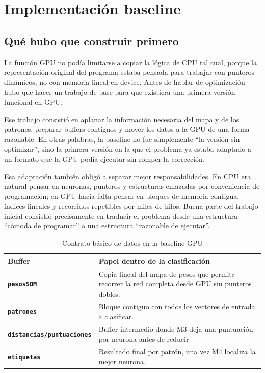 \documentclass[11pt,a4paper]{article}
\begin{document}
\section{Implementación baseline}

\subsection{Qué hubo que construir primero}

La función GPU no podía limitarse a copiar la lógica de CPU tal cual, porque la representación original del programa estaba pensada para trabajar con punteros dinámicos, no con memoria lineal en device. Antes de hablar de optimización hubo que hacer un trabajo de base para que existiera una primera versión funcional en GPU.

Ese trabajo consistió en aplanar la información necesaria del mapa y de los patrones, preparar buffers contiguos y mover los datos a la GPU de una forma razonable. En otras palabras, la baseline no fue simplemente ``la versión sin optimizar'', sino la primera versión en la que el problema ya estaba adaptado a un formato que la GPU podía ejecutar sin romper la corrección.

Esa adaptación también obligó a separar mejor responsabilidades. En CPU era natural pensar en neuronas, punteros y estructuras enlazadas por conveniencia de programación; en GPU hacía falta pensar en bloques de memoria contigua, índices lineales y recorridos repetibles por miles de hilos. Buena parte del trabajo inicial consistió precisamente en traducir el problema desde una estructura ``cómoda de programar'' a una estructura ``razonable de ejecutar''.

\begin{table}[H]
\centering
\caption{Contrato básico de datos en la baseline GPU}
\label{tab:baseline-datos}
\begin{tabularx}{\textwidth}{>{\bfseries}l L}
\toprule
Buffer & Papel dentro de la clasificación \\
\midrule
\texttt{pesosSOM} & Copia lineal del mapa de pesos que permite recorrer la red completa desde GPU sin punteros dobles. \\
\texttt{patrones} & Bloque contiguo con todos los vectores de entrada a clasificar. \\
\texttt{distancias/puntuaciones} & Buffer intermedio donde M3 deja una puntuación por neurona antes de reducir. \\
\texttt{etiquetas} & Resultado final por patrón, una vez M4 localiza la mejor neurona. \\
\bottomrule
\end{tabularx}
\end{table}
\end{document}
